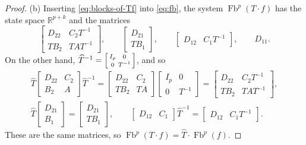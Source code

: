 \documentclass[11pt,a4paper]{article}
\theoremstyle{plain}
\theoremstyle{definition}
\theoremstyle{remark}
\DeclareMathOperator{\Fb}{Fb}
\newcommand{\R}{\mathbb{R}}
\begin{document}
\begin{proof}
    (b) Inserting \cref{eq:blocks-of-Tf} into \cref{eq:fb}, the system $\Fb^p(T \cdot f)$ has the state space $\R^{p+k}$ and the matrices
    \begin{equation*}
        \begin{bmatrix} D_{22} & C_2 T^{-1} \\ T B_2 & T A T^{-1} \end{bmatrix},
        \qquad
        \begin{bmatrix} D_{21} \\ T B_1 \end{bmatrix},
        \qquad
        \begin{bmatrix} D_{12} & C_1 T^{-1} \end{bmatrix},
        \qquad
        D_{11} .
    \end{equation*}
    On the other hand, $\widehat{T}^{-1} = \begin{bsmallmatrix} I_p & 0 \\ 0 & T^{-1} \end{bsmallmatrix}$, and so
    \begin{gather*}
        \widehat{T} \begin{bmatrix} D_{22} & C_2 \\ B_2 & A \end{bmatrix} \widehat{T}^{-1}
        = \begin{bmatrix} D_{22} & C_2 \\ T B_2 & T A \end{bmatrix} \begin{bmatrix} I_p & 0 \\ 0 & T^{-1} \end{bmatrix}
        = \begin{bmatrix} D_{22} & C_2 T^{-1} \\ T B_2 & T A T^{-1} \end{bmatrix}, \\
        \widehat{T} \begin{bmatrix} D_{21} \\ B_1 \end{bmatrix} = \begin{bmatrix} D_{21} \\ T B_1 \end{bmatrix},
        \qquad
        \begin{bmatrix} D_{12} & C_1 \end{bmatrix} \widehat{T}^{-1} = \begin{bmatrix} D_{12} & C_1 T^{-1} \end{bmatrix} .
    \end{gather*}
    These are the same matrices, so $\Fb^p(T \cdot f) = \widehat{T} \cdot \Fb^p(f)$.
\end{proof}
\end{document}
